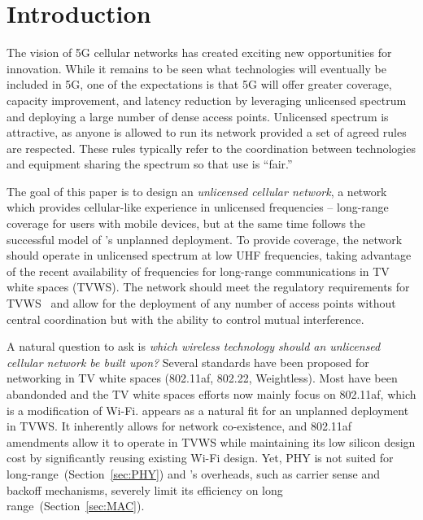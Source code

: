 \section{Introduction}
The vision of 5G cellular networks has created exciting new opportunities for innovation. 
While it remains to be seen what technologies will eventually be included in 5G, 
one of the expectations is that
5G will offer greater coverage, capacity improvement, and latency reduction
by leveraging unlicensed spectrum and deploying a large number of
dense access points. Unlicensed spectrum is attractive, as anyone is
allowed to run its network provided a set of agreed rules are respected.  These
rules typically refer to the coordination between technologies and
equipment sharing the spectrum so that use is ``fair.''

The goal of this paper is to design an {\em unlicensed cellular network}, a network which provides cellular-like experience in unlicensed frequencies -- long-range coverage for users with mobile devices,
but at the same time follows the successful model of \wf's unplanned deployment.
To provide coverage, the network should operate in unlicensed spectrum at low UHF frequencies,
taking advantage of the recent availability of frequencies for long-range communications in TV white spaces (TVWS).
The network should meet the regulatory requirements for TVWS~\cite{etsi_tvws, Rice_af} and allow for the deployment of any number of access points without central coordination but with the ability to control mutual interference.

A natural question to ask is \emph{which wireless technology should an unlicensed cellular network be built upon?}
Several standards have been proposed for networking in TV white spaces (802.11af\cite{Rice_af}, 802.22\cite{802.22}, Weightless\cite{weightless}). Most have been abandonded and the TV white spaces efforts now mainly focus 
on 802.11af, which is a modification of Wi-Fi. 
\wf appears as a natural fit for an unplanned deployment in TVWS.
It inherently allows for network co-existence, and 802.11af amendments allow it to operate in TVWS while maintaining its low silicon design cost by significantly reusing existing Wi-Fi design. 
Yet, \wf PHY is not suited for long-range~(Section~\ref{sec:PHY}) and 
\wf's overheads, such as carrier sense and backoff mechanisms, severely limit its efficiency on long range~(Section~\ref{sec:MAC}). 



